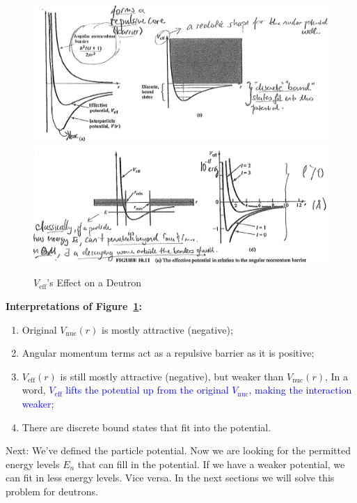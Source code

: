 \documentclass{school-22.101-notes}
\begin{document}
\clearpage
\begin{figure}
    \centering
    \includegraphics[width=5in]{images/deuteron/deutrium-V-eff.png}
    \\
    \includegraphics[width=5.5in]{images/deuteron/deutrium-V-eff-2.png}    
    \caption{$V_{\mathrm{eff}}$'s Effect on a Deutron}
    \label{V-eff}
\end{figure}
\textbf{Interpretations of Figure~\ref{V-eff}:}
\begin{enumerate}
\item Original $V_{\mathrm{nuc}} (r)$ is mostly attractive (negative); 
\item Angular momentum terms act as a repulsive barrier as it is positive;
\item $V_{\mathrm{eff}} (r)$ is still mostly attractive (negative), but weaker than $V_{\mathrm{nuc}} (r)$, In a word, \textcolor{blue}{$V_{\mathrm{eff}}$ lifts the potential up from the original $V_{\mathrm{nuc}}$, making the interaction weaker;} 
\item There are discrete bound states that fit into the potential. 
\end{enumerate}

Next: We've defined the particle potential. Now we are looking for the permitted energy levels $E_n$ that can fill in the potential. If we have a weaker potential, we can fit in less energy levels. Vice versa. In the next sections we will solve this problem for deutrons. 
\end{document}
